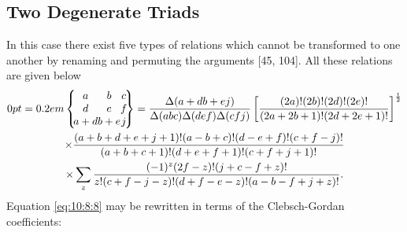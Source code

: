 \subsection{Two Degenerate Triads}\label{sec:10.8.3}
In this case there exist five types of relations which cannot be transformed to one another by renaming and permuting the arguments [45, 104]. All these relations are given below
\begin{gather}
\ninej{a}{b}{c}{d}{e}{f}{a+d}{b+e}{j}=\frac{\Delta(a+d b+e j)}{\Delta(a b c) \Delta(d e f) \Delta(c f j)}\left[\frac{(2 a)!(2 b)!(2 d)!(2 e)!}{(2 a+2 b+1)!(2 d+2 e+1)!}\right]^{\frac{1}{2}}  \notag\\
\times \frac{(a+b+d+e+j+1)!(a-b+c)!(d-e+f)!(c+f-j)!}{(a+b+c+1)!(d+e+f+1)!(c+f+j+1)!}  \notag\\
\times \sum_{z} \frac{(-1)^{z}(2 f-z)!(j+c-f+z)!}{z!(c+f-j-z)!(d+f-e-z)!(a-b-f+j+z)!} . \label{eq:10:8:8}
\end{gather}
Equation \eqref{eq:10:8:8} may be rewritten in terms of the Clebsch-Gordan coefficients:
